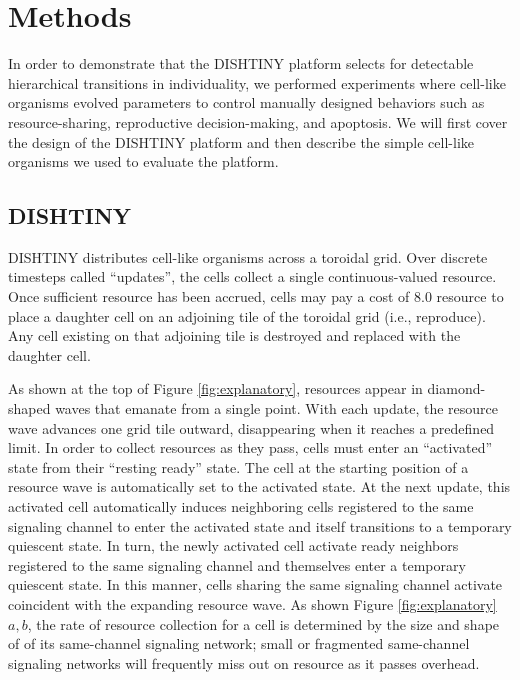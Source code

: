\section{Methods}

In order to demonstrate that the DISHTINY platform selects for detectable hierarchical transitions in individuality, we performed experiments where cell-like organisms evolved parameters to control manually designed behaviors such as resource-sharing, reproductive decision-making, and apoptosis.
We will first cover the design of the DISHTINY platform and then describe the simple cell-like organisms we used to evaluate the platform.

\subsection{DISHTINY}



DISHTINY distributes cell-like organisms across a toroidal grid.
Over discrete timesteps called ``updates'', the cells collect a single continuous-valued resource.
Once sufficient resource has been accrued, cells may pay a cost of $8.0$ resource to place a daughter cell on an adjoining tile of the toroidal grid (i.e., reproduce).
Any cell existing on that adjoining tile is destroyed and replaced with the daughter cell.

As shown at the top of Figure \ref{fig:explanatory}, resources appear in diamond-shaped waves that emanate from a single point.
With each update, the resource wave advances one grid tile outward, disappearing when it reaches a predefined limit.
In order to collect resources as they pass, cells must enter an ``activated'' state from their ``resting ready'' state.
The cell at the starting position of a resource wave is automatically set to the activated state.
At the next update, this activated cell automatically induces neighboring cells registered to the same signaling channel to enter the activated state and itself transitions to a temporary quiescent state.
In turn, the newly activated cell activate ready neighbors registered to the same signaling channel and themselves enter a temporary quiescent state.
In this manner, cells sharing the same signaling channel activate coincident with the expanding resource wave.
As shown Figure \ref{fig:explanatory}$a,b$, the rate of resource collection for a cell is determined by the size and shape of of its same-channel signaling network;
small or fragmented same-channel signaling networks will frequently miss out on resource as it passes overhead.

